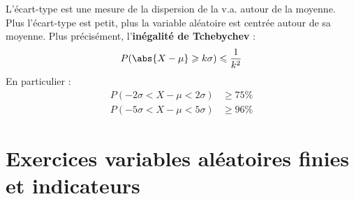 \documentclass[main.tex]{subfiles}
\begin{document}
\begin{remark} L'écart-type est une mesure de la dispersion de la v.a. autour de la moyenne. Plus l'écart-type est petit, plus la variable aléatoire est centrée autour de sa moyenne. Plus précisément, l'\textbf{inégalité de Tchebychev}   :
	\setlength{\abovedisplayskip}{3pt}
	\setlength{\belowdisplayskip}{3pt}  
	$$	
	P(\abs{X-\mu}\geqslant k\sigma ) \leqslant \frac{1}{k^2}
	$$ 
En particulier :
	\begin{align*}
		P(-2\sigma< X-\mu<2\sigma )& \geqslant 75\%\\
		P(-5\sigma< X-\mu<5\sigma )& \geqslant 96\%
	\end{align*}

\end{remark}
%	 
\newpage 
{}  
\pagestyle{scrheadings} %
\onehalfspacing 
\section{Exercices variables aléatoires finies et indicateurs}
\end{document}
